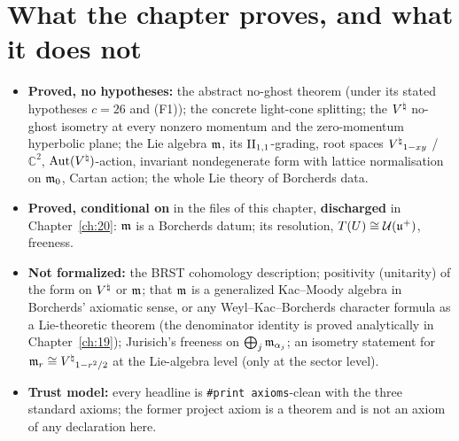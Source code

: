 \section{What the chapter proves, and what it does not}\label{ch18:sec:scope}

\begin{itemize}
\item \textbf{Proved, no hypotheses:} the abstract no-ghost theorem (under its stated hypotheses $c=26$ and (F1)); the concrete
  light-cone splitting; the ${V^{\natural}}$ no-ghost isometry at every nonzero momentum and the zero-momentum hyperbolic plane; the Lie algebra
  $\mathfrak{m}$, its $\mathrm{II}_{1,1}$-grading, root spaces ${V^{\natural}}_{1-xy}$ / $\mathbb C^2$, $\operatorname{Aut}({V^{\natural}})$-action, invariant nondegenerate form with lattice
  normalisation on $\mathfrak{m}_0$, Cartan action; the whole Lie theory of Borcherds data.
\item \textbf{Proved, conditional on } in the files of this chapter, \textbf{discharged} in Chapter~\ref{ch:20}: $\mathfrak{m}$ is a
  Borcherds datum; its resolution, $T(U)\cong \mathcal U(\mathfrak{u}^+)$, freeness.
\item \textbf{Not formalized:} the BRST cohomology description; positivity (unitarity) of the form on ${V^{\natural}}$ or $\mathfrak{m}$; that $\mathfrak{m}$ is a
  generalized Kac--Moody algebra in Borcherds' axiomatic sense, or any Weyl--Kac--Borcherds character formula as a Lie-theoretic
  theorem (the denominator identity is proved analytically in Chapter~\ref{ch:19}); Jurisich's freeness on $\bigoplus_j\mathfrak{m}_{\alpha_j}$; an
  isometry statement for $\mathfrak{m}_r\cong{V^{\natural}}_{1-r^2/2}$ at the Lie-algebra level (only at the sector level).
\item \textbf{Trust model:} every headline is \texttt{\#print axioms}-clean with the three standard axioms; the former project axiom
   is a theorem and is not an axiom of any declaration here.
\end{itemize}

